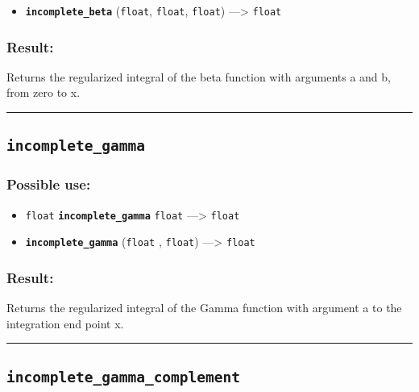 \documentclass[]{book}
\providecommand{\tightlist}{%
  \setlength{\itemsep}{0pt}\setlength{\parskip}{0pt}}
\theoremstyle{definition}
\theoremstyle{definition}
\theoremstyle{definition}
\theoremstyle{remark}
\begin{document}
\begin{itemize}
\tightlist
\item
  \textbf{\texttt{incomplete\_beta}} (\texttt{float}, \texttt{float},
  \texttt{float}) ---\textgreater{} \texttt{float}
\end{itemize}

\subsubsection{Result:}\label{result-259}

Returns the regularized integral of the beta function with arguments a
and b, from zero to x.

\begin{center}\rule{0.5\linewidth}{\linethickness}\end{center}

\subsection{\texorpdfstring{\texttt{incomplete\_gamma}}{incomplete\_gamma}}\label{incomplete_gamma}

\subsubsection{Possible use:}\label{possible-use-270}

\begin{itemize}
\tightlist
\item
  \texttt{float} \textbf{\texttt{incomplete\_gamma}} \texttt{float}
  ---\textgreater{} \texttt{float}
\item
  \textbf{\texttt{incomplete\_gamma}} (\texttt{float} , \texttt{float})
  ---\textgreater{} \texttt{float}
\end{itemize}

\subsubsection{Result:}\label{result-260}

Returns the regularized integral of the Gamma function with argument a
to the integration end point x.

\begin{center}\rule{0.5\linewidth}{\linethickness}\end{center}

\subsection{\texorpdfstring{\texttt{incomplete\_gamma\_complement}}{incomplete\_gamma\_complement}}\label{incomplete_gamma_complement}
\end{document}

